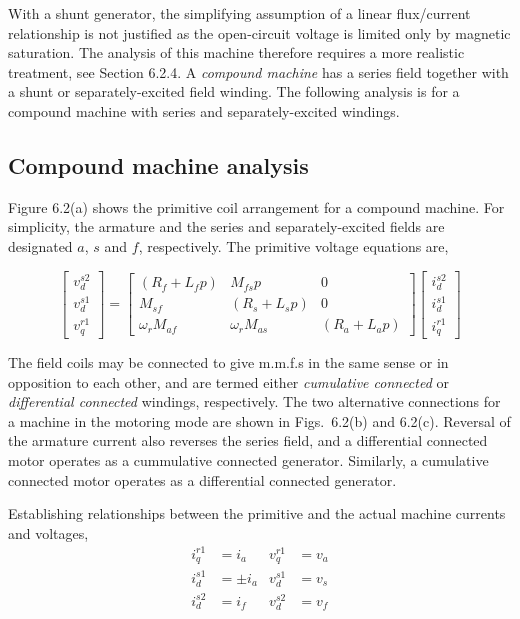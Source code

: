 \documentclass[a4paper,numbers=noenddot,12pt]{scrbook}
\begin{document}
With a shunt generator, the simplifying assumption of a linear flux/current relationship is not justified as the open-circuit voltage is limited only by magnetic saturation. The analysis of this machine therefore requires a more realistic treatment, see Section 6.2.4.
A \textit{compound machine} has a series field together with a shunt or separately-excited field winding. The following analysis is for a compound machine with series and separately-excited windings.
\subsection{Compound machine analysis}
Figure 6.2(a) shows the primitive coil arrangement for a compound machine. For simplicity, the armature and the series and separately-excited fields are designated $a$, $s$ and $f$, respectively. The primitive voltage equations are,

\begin{equation}
    \begin{bmatrix}
        v_d^{s2}\\[2ex] v_d^{s1}\\[2ex] v_q^{r1}
    \end{bmatrix} =
    \begin{bmatrix}
        (R_f + L_f p) & M_{fs} p & 0 \\[2ex]
        M_{sf} & (R_s + L_s p) & 0 \\[2ex]
        \omega_r M_{af} & \omega_r M_{as} & (R_a + L_a p)
    \end{bmatrix}
    \begin{bmatrix}
        i_d^{s2} \\[2ex] i_d^{s1} \\[2ex] i_q^{r1}
    \end{bmatrix}
    \label{}
\end{equation}

The field coils may be connected to give m.m.f.s in the same sense or in opposition to each other, and are termed either \textit{cumulative connected} or \textit{differential connected} windings, respectively. The two alternative connections for a machine in the motoring mode are shown in Figs.\ 6.2(b) and 6.2(c).
Reversal of the armature current also reverses the series field, and a differential connected motor operates as a cummulative connected generator. Similarly, a cumulative connected motor operates as a differential connected generator.

Establishing relationships between the primitive and the actual machine currents and voltages,
\begin{align*}
    i_q^{r1} & = i_a & v_q^{r1} & = v_a \\[2ex]
    i_d^{s1} & = \pm i_a & v_d^{s1} & = v_s \\[2ex]
    i_d^{s2} & = i_f & v_d^{s2} & = v_f
\end{align*}
\end{document}
